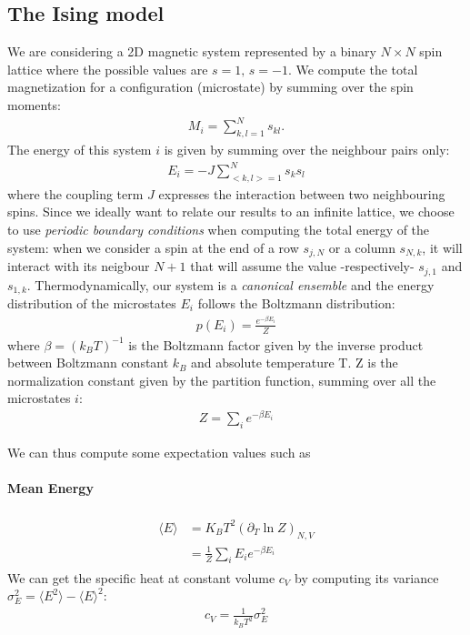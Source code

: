 \documentclass[%
 reprint,
 amsmath,amssymb,
 aps,
]{revtex4-1}
\theoremstyle{plain}
\theoremstyle{definition}
\theoremstyle{plain}
\newcommand{\mean}[1]{\langle #1\rangle}
\begin{document}
	\subsection{The Ising model}
	We are considering a 2D magnetic system represented by a binary $N\times N$ spin lattice where the possible values are $s=1,\, s=-1$. We compute the total magnetization  for a configuration (microstate) by summing over the spin moments: 
	\begin{align*}
		M_i=\sum_{k,l=1}^{N}s_{kl}.
	\end{align*} 
	The energy of this system $i$ is given by summing over the neighbour pairs only:
	\begin{align*}
		E_i = -J\sum_{<k,l>=1}^{N}s_ks_l
	\end{align*}
	where the coupling term $J$ expresses the interaction between two neighbouring spins.
	Since we ideally want to relate our results to an infinite lattice, we choose to use \textit{periodic boundary conditions} when computing the total energy of the system: when we consider a spin at the end of a row $s_{j,N}$ or a column $s_{N,k}$, it will interact with its neigbour $N+1$ that will assume the value -respectively- $s_{j,1}$ and $s_{1,k}$.
	Thermodynamically, our system is a \textit{canonical ensemble} and the energy distribution of the microstates $E_i$ follows the Boltzmann distribution:
	\begin{align*}
		p(E_i) = \frac{e^{-\beta E_i}}{Z}
	\end{align*}
	where $\beta=(k_BT)^{-1}$ is the Boltzmann factor given by the inverse product between Boltzmann constant $k_B$ and absolute temperature T. Z is the normalization constant given by the partition function, summing over all the microstates $i$:
	\begin{align*}
		Z=\sum_{i}e^{-\beta E_i}
	\end{align*}
	
	We can thus compute some expectation values such as
	
	\paragraph*{\textbf{Mean Energy}}
	\begin{align*}
	\begin{split}
		\mean{E}&=K_BT^2(\partial_T\ln Z)_{N,V}\\
		&=\frac{1}{Z}\sum_i E_ie^{-\beta E_i}
	\end{split}
	\end{align*}
	We can get the specific heat at constant volume $c_V$ by computing its variance $\sigma_E^2=\mean{E^2} - \mean{E}^2$:
	\begin{align*}
	c_V=\frac{1}{k_BT^2}\sigma_E^2
	\end{align*}
	
\end{document}
